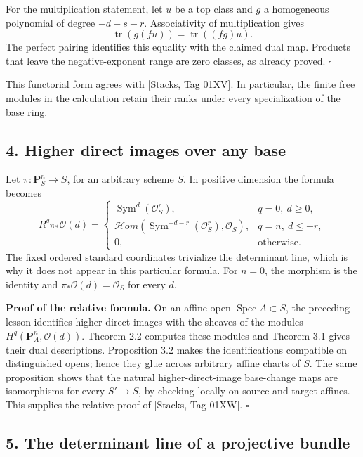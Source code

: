 \documentclass[11pt]{article}
\begin{document}
For the multiplication statement, let \(u\) be a top class and \(g\) a
homogeneous polynomial of degree \(-d-s-r\). Associativity of
multiplication gives \[
\operatorname{tr}(g(fu))=\operatorname{tr}((fg)u).
\] The perfect pairing identifies this equality with the claimed dual
map. Products that leave the negative-exponent range are zero classes,
as already proved. \(\square\)

This functorial form agrees with {[}Stacks, Tag 01XV{]}. In particular,
the finite free modules in the calculation retain their ranks under
every specialization of the base ring.

\subsection{4. Higher direct images over any
base}\label{higher-direct-images-over-any-base}

Let \(\pi:\mathbf P_S^n\to S\), for an arbitrary scheme \(S\). In
positive dimension the formula becomes \[
R^q\pi_*\mathcal O(d)=
\begin{cases}
\operatorname{Sym}^d(\mathcal O_S^{r}),&q=0,\ d\ge0,\\
\mathcal H om(\operatorname{Sym}^{-d-r}(\mathcal O_S^{r}),\mathcal O_S),
&q=n,\ d\le-r,\\
0,&\text{otherwise}.
\end{cases}
\] The fixed ordered standard coordinates trivialize the determinant
line, which is why it does not appear in this particular formula. For
\(n=0\), the morphism is the identity and
\(\pi_*\mathcal O(d)=\mathcal O_S\) for every \(d\).

\textbf{Proof of the relative formula.} On an affine open
\(\operatorname{Spec}A\subset S\), the preceding lesson identifies
higher direct images with the sheaves of the modules
\(H^q(\mathbf P_A^n,\mathcal O(d))\). Theorem 2.2 computes these modules
and Theorem 3.1 gives their dual descriptions. Proposition 3.2 makes the
identifications compatible on distinguished opens; hence they glue
across arbitrary affine charts of \(S\). The same proposition shows that
the natural higher-direct-image base-change maps are isomorphisms for
every \(S'\to S\), by checking locally on source and target affines.
This supplies the relative proof of {[}Stacks, Tag 01XW{]}. \(\square\)

\subsection{5. The determinant line of a projective
bundle}\label{the-determinant-line-of-a-projective-bundle}
\end{document}
